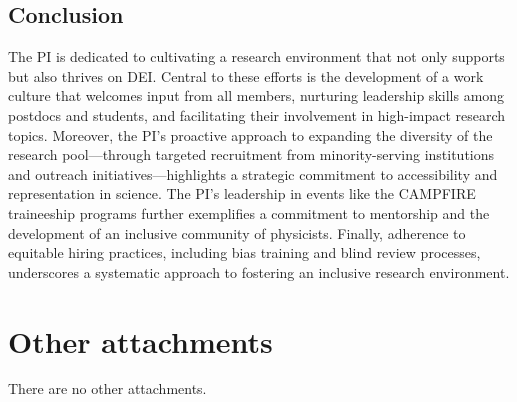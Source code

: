 \documentclass[letter, USenglish, 11pt, subfigure]{article}
\begin{document}
\subsection{Conclusion}

The PI is dedicated to cultivating a research environment that not only supports but also thrives on DEI. Central to these efforts is the development of a work culture that welcomes input from all members, nurturing leadership skills among postdocs and students, and facilitating their involvement in high-impact research topics. Moreover, the PI's proactive approach to expanding the diversity of the research pool—through targeted recruitment from minority-serving institutions and outreach initiatives—highlights a strategic commitment to accessibility and representation in science. The PI's leadership in events like the CAMPFIRE traineeship programs further exemplifies a commitment to mentorship and the development of an inclusive community of physicists. Finally, adherence to equitable hiring practices, including bias training and blind review processes, underscores a systematic approach to fostering an inclusive research environment.

\clearpage

\section{Other attachments}
There are no other attachments.
\end{document}
